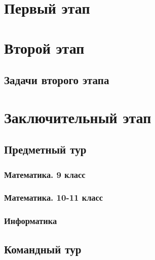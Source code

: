 \documentclass[a4paper,12pt,oneside]{book}
\begin{document}

\setcounter{tocdepth}{1}

\tableofcontents

\part{Первый этап}




\part{Второй этап}
\clearpage
\chapter{Задачи второго этапа}



\part{Заключительный этап}

\clearpage
\chapter{Предметный тур}

\section{Математика. 9 класс}


\section{Математика. 10-11 класс}


\section{Информатика}


\chapter{Командный тур}

\end{document}
